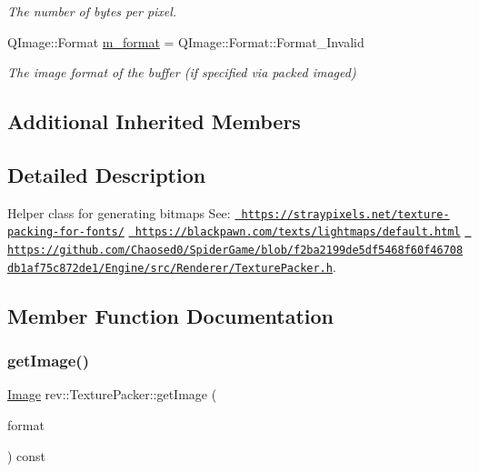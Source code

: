 \begin{Indent}
\begin{DoxyCompactItemize}
\begin{DoxyCompactList}\small\item\em The number of bytes per pixel. \end{DoxyCompactList}\item 
\mbox{\label{classrev_1_1_texture_packer_a5359b351f346a37fcc8acad14f794514}} 
Q\+Image\+::\+Format \mbox{\hyperlink{classrev_1_1_texture_packer_a5359b351f346a37fcc8acad14f794514}{m\+\_\+format}} = Q\+Image\+::\+Format\+::\+Format\+\_\+\+Invalid
\begin{DoxyCompactList}\small\item\em The image format of the buffer (if specified via packed imaged) \end{DoxyCompactList}\end{DoxyCompactItemize}
\end{Indent}
\subsection*{Additional Inherited Members}


\subsection{Detailed Description}
Helper class for generating bitmaps See\+: \href{https://straypixels.net/texture-packing-for-fonts/}{\texttt{ https\+://straypixels.\+net/texture-\/packing-\/for-\/fonts/}} \href{https://blackpawn.com/texts/lightmaps/default.html}{\texttt{ https\+://blackpawn.\+com/texts/lightmaps/default.\+html}} \href{https://github.com/Chaosed0/SpiderGame/blob/f2ba2199de5df5468f60f46708db1af75c872de1/Engine/src/Renderer/TexturePacker.h}{\texttt{ https\+://github.\+com/\+Chaosed0/\+Spider\+Game/blob/f2ba2199de5df5468f60f46708db1af75c872de1/\+Engine/src/\+Renderer/\+Texture\+Packer.\+h}}. 

\subsection{Member Function Documentation}
\mbox{\label{classrev_1_1_texture_packer_a8d34c1b28c46adf169fce7edcc52aad9}} 
\subsubsection{\texorpdfstring{getImage()}{getImage()}}
{\footnotesize\ttfamily \mbox{\hyperlink{classrev_1_1_image}{Image}} rev\+::\+Texture\+Packer\+::get\+Image (\begin{DoxyParamCaption}\item[{Q\+Image\+::\+Format}]{format }\end{DoxyParamCaption}) const}



